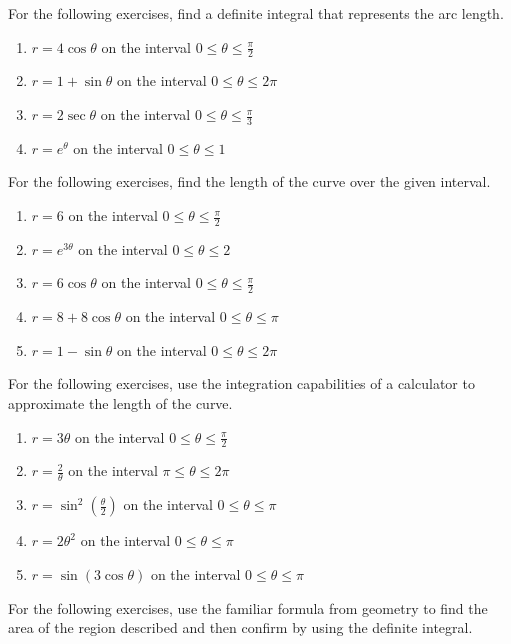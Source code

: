 \documentclass{exercises}
\begin{document}
For the following exercises, find a definite integral that represents the arc length.

\begin{enumerate}[resume]
\item $r=4\cos \theta$ on the interval $0\le \theta \le \frac{\pi}{2}$
\item $r=1+\sin \theta$ on the interval $0\le \theta \le 2\pi$
\item $r=2\sec \theta$ on the interval $0\le \theta \le \frac{\pi}{3}$
\item $r=e^{\theta}$ on the interval $0\le \theta \le 1$
\end{enumerate}

For the following exercises, find the length of the curve over the given interval.

\begin{enumerate}[resume]
\item $r=6$ on the interval $0\le \theta \le \frac{\pi}{2}$
\item $r=e^{3\theta}$ on the interval $0\le \theta \le 2$
\item $r=6\cos \theta$ on the interval $0\le \theta \le \frac{\pi}{2}$
\item $r=8+8\cos \theta$ on the interval $0\le \theta \le \pi$
\item $r=1-\sin \theta$ on the interval $0\le \theta \le 2\pi$
\end{enumerate}

For the following exercises, use the integration capabilities of a calculator to approximate the length of the curve.

\begin{enumerate}[resume]
\item \techrequired $r=3\theta$ on the interval $0\le \theta \le \frac{\pi}{2}$
\item \techrequired $r=\frac{2}{\theta}$ on the interval $\pi \le \theta \le 2\pi$
\item \techrequired $r=\sin^{2}(\frac{\theta}{2})$ on the interval $0\le \theta \le \pi$
\item \techrequired $r=2\theta^{2}$ on the interval $0\le \theta \le \pi$
\item \techrequired $r=\sin(3\cos \theta)$ on the interval $0\le \theta \le \pi$
\end{enumerate}

For the following exercises, use the familiar formula from geometry to find the area of the region described and then confirm by using the definite integral.
\end{document}
